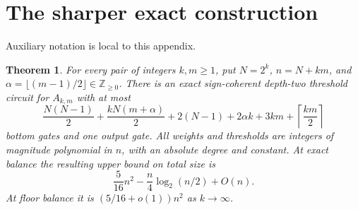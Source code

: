 \documentclass[11pt]{article}
\newtheorem{theorem}{Theorem}[section]
\begin{document}
\appendix
\section{The sharper exact construction}\label{sec:exact}
Auxiliary notation is local to this appendix.

\begin{theorem}\label{thm:exact}
For every pair of integers $k,m\ge1$, put $N=2^k$, $n=N+km$, and
$\alpha=\lfloor(m-1)/2\rfloor\in\mathbb Z_{\ge0}$.
There is an exact sign-coherent depth-two threshold circuit for
$A_{k,m}$ with at most
\begin{equation}\label{eq:bestcount}
\frac{N(N-1)}2+\frac{kN(m+\alpha)}2
 +2(N-1)+2\alpha k+3km+\left\lceil\frac{km}{2}\right\rceil
\end{equation}
bottom gates and one output gate. All weights and thresholds are integers
of magnitude polynomial in $n$, with an absolute degree and constant.
At exact balance the resulting upper bound on total size is
$$\frac5{16}n^2-\frac n4\log_2(n/2)+O(n).$$
At floor balance it is $(5/16+o(1))n^2$ as $k\to\infty$.
\end{theorem}
\end{document}
